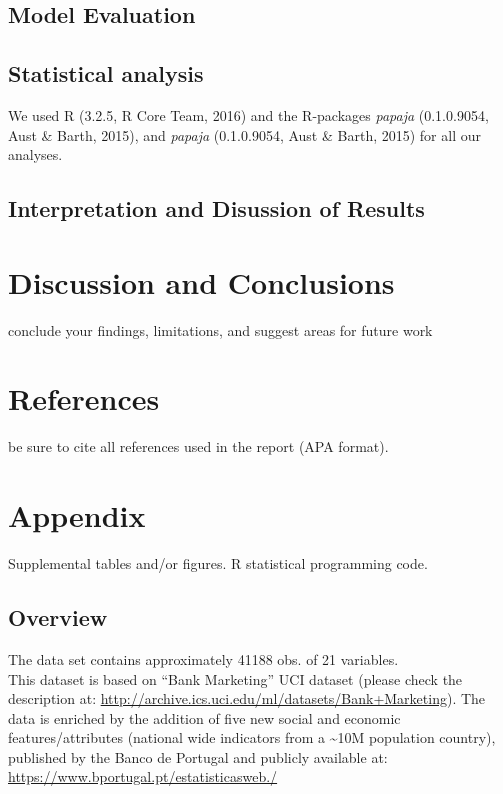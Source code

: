 \documentclass[english,man]{apa6}
\begin{document}
\subsection{Model Evaluation}\label{model-evaluation}

\subsection{Statistical analysis}\label{statistical-analysis}

We used R (3.2.5, R Core Team, 2016) and the R-packages \emph{papaja}
(0.1.0.9054, Aust \& Barth, 2015), and \emph{papaja} (0.1.0.9054, Aust
\& Barth, 2015) for all our analyses.

\subsection{Interpretation and Disussion of
Results}\label{interpretation-and-disussion-of-results}

\section{Discussion and Conclusions}\label{discussion-and-conclusions}

conclude your findings, limitations, and suggest areas for future work

\section{References}\label{references}

be sure to cite all references used in the report (APA format).

\section{Appendix}\label{appendix}

Supplemental tables and/or figures. R statistical programming code.

\setlength{\parindent}{-0.5in} \setlength{\leftskip}{0.5in}
\setlength{\parskip}{11pt}

\subsection{Overview}\label{overview}

The data set contains approximately 41188 obs. of 21 variables.\\
 This dataset is based on \enquote{Bank Marketing} UCI dataset (please
check the description at:
\url{http://archive.ics.uci.edu/ml/datasets/Bank+Marketing}). The data
is enriched by the addition of five new social and economic
features/attributes (national wide indicators from a
\textasciitilde{}10M population country), published by the Banco de
Portugal and publicly available at:
\url{https://www.bportugal.pt/estatisticasweb./}
\end{document}
